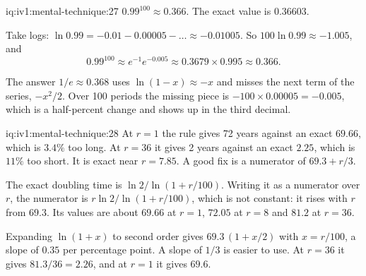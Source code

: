 \begin{solution}{iq:iv1:mental-technique:27}
$0.99^{100} \approx 0.366$. The exact value is $0.36603$.

Take logs: $\ln 0.99 = -0.01 - 0.00005 - \dots \approx -0.01005$. So $100 \ln 0.99 \approx -1.005$, and
\[
0.99^{100} \approx e^{-1} e^{-0.005} \approx 0.3679 \times 0.995 \approx 0.366.
\]

The answer $1/e \approx 0.368$ uses $\ln(1 - x) \approx -x$ and misses the next term of the series, $-x^2/2$. Over 100 periods the missing piece is $-100 \times 0.00005 = -0.005$, which is a half-percent change and shows up in the third decimal.

\end{solution}

\begin{solution}{iq:iv1:mental-technique:28}
At $r = 1$ the rule gives 72 years against an exact $69.66$, which is $3.4\%$ too long. At $r = 36$ it gives 2 years against an exact $2.25$, which is $11\%$ too short. It is exact near $r = 7.85$. A good fix is a numerator of $69.3 + r/3$.

The exact doubling time is $\ln 2 / \ln(1 + r/100)$. Writing it as a numerator over $r$, the numerator is $r \ln 2 / \ln(1 + r/100)$, which is not constant: it rises with $r$ from $69.3$. Its values are about $69.66$ at $r = 1$, $72.05$ at $r = 8$ and $81.2$ at $r = 36$.

Expanding $\ln(1 + x)$ to second order gives $69.3\,(1 + x/2)$ with $x = r/100$, a slope of $0.35$ per percentage point. A slope of $1/3$ is easier to use. At $r = 36$ it gives $81.3/36 = 2.26$, and at $r = 1$ it gives $69.6$.

\end{solution}

